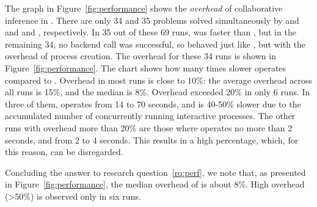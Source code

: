 The graph in Figure~\ref{fig:performance} shows the \textit{overhead} of collaborative inference in \theringenCICI{}. There are only 34 and 35 problems solved simultaneously by \racer{} and \ringenCICI{\cvc{}} and \racer{} and \ringenCICI{\vampire{}}, respectively. In 35 out of these 69 runs, \theringenCICI{} was faster than \racer{}, but in the remaining 34, no backend call was successful, so \theringenCICI{} behaved just like \racer{}, but with the overhead of process creation. The overhead for these 34 runs is shown in Figure~\ref{fig:performance}. The chart shows how many times slower \theringenCICI{} operates compared to \racer{}. Overhead in most runs is close to 10\%: the average overhead across all runs is 15\%, and the median is 8\%.
Overhead exceeded 20\% in only 6 runs. In three of them, \racer{} operates from 14 to 70 seconds, and \theringenCICI{} is 40-50\% slower due to the accumulated number of concurrently running interactive processes. The other runs with overhead more than 20\% are those where \racer{} operates no more than 2 seconds, and \theringenCICI{} from 2 to 4 seconds. This results in a high percentage, which, for this reason, can be disregarded.

Concluding the answer to research question~\ref{rq:perf}, we note that, as presented in Figure~\ref{fig:performance}, the median overhead of \theringenCICI{} is about 8\%. High overhead (>50\%) is observed only in six runs.

